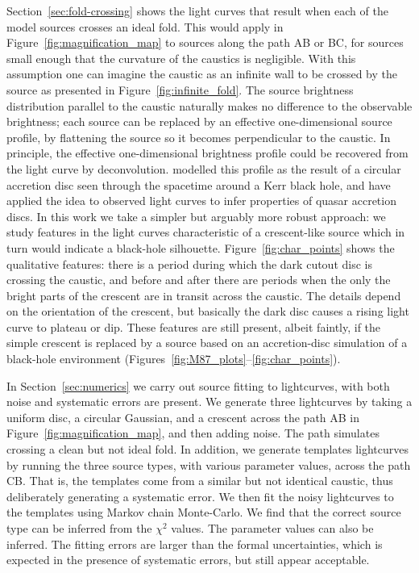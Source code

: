 \documentclass[usenatbib]{mn2e}
\begin{document}
Section~\ref{sec:fold-crossing} shows the light curves that result
when each of the model sources crosses an ideal fold.  This would
apply in Figure~\ref{fig:magnification_map} to sources along the path
AB or BC, for sources small enough that the curvature of the caustics
is negligible.  With this assumption one can imagine the caustic as an
infinite wall to be crossed by the source as presented in
Figure~\ref{fig:infinite_fold}.  The source brightness distribution
parallel to the caustic naturally makes no difference to the
observable brightness; each source can be replaced by an effective
one-dimensional source profile, by flattening the source so it becomes
perpendicular to the caustic.  In principle, the effective
one-dimensional brightness profile could be recovered from the light
curve by deconvolution.  \cite{1999ApJ...524...49A} modelled this
profile as the result of a circular accretion disc seen through the
spacetime around a Kerr black hole, and \cite{2012MNRAS.423..676A}
have applied the idea to observed light curves to infer properties of
quasar accretion discs.  In this work we take a simpler but arguably
more robust approach: we study features in the light curves
characteristic of a crescent-like source which in turn would indicate
a black-hole silhouette.  Figure~\ref{fig:char_points} shows the
qualitative features: there is a period during which the dark cutout
disc is crossing the caustic, and before and after there are periods
when the only the bright parts of the crescent are in transit across
the caustic.  The details depend on the orientation of the crescent,
but basically the dark disc causes a rising light curve to plateau or
dip.  These features are still present, albeit faintly, if the simple
crescent is replaced by a source based on an accretion-disc simulation
of a black-hole environment
(Figures~\ref{fig:M87_plots}--\ref{fig:char_points}).


In Section~\ref{sec:numerics} we carry out source fitting to
lightcurves, with both noise and systematic errors are present.  We
generate three lightcurves by taking a uniform disc, a circular
Gaussian, and a crescent across the path AB in
Figure~\ref{fig:magnification_map}, and then adding noise.  The path
simulates crossing a clean but not ideal fold.  In addition, we
generate templates lightcurves by running the three source types, with
various parameter values, across the path CB.  That is, the templates
come from a similar but not identical caustic, thus deliberately
generating a systematic error.  We then fit the noisy lightcurves to
the templates using Markov chain Monte-Carlo.  We find that the
correct source type can be inferred from the $\chi^2$ values.  The
parameter values can also be inferred. The fitting errors are larger
than the formal uncertainties, which is expected in the presence of
systematic errors, but still appear acceptable.
\end{document}
